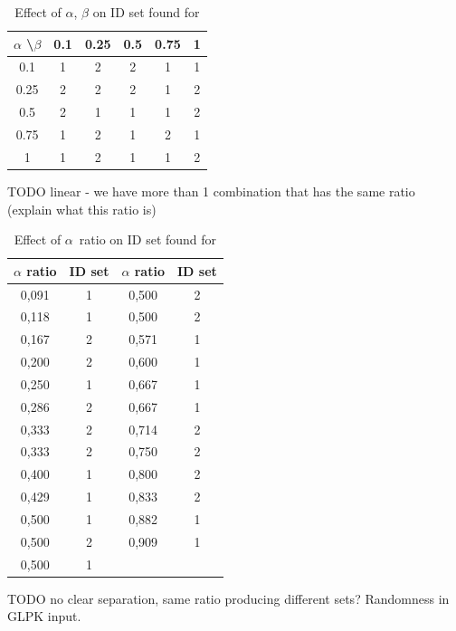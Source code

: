 \begin{table}
  \caption{Effect of $\alpha$, $\beta$ on ID set found for }
  \bigskip
  \label{table-experiments-various-betas-ova1-effect}
  \centering
  \begin{tabular}{c | c  c  c  c  c}
    $\alpha$ \textbackslash $\beta$ & 0.1 & 0.25 & 0.5 & 0.75 & 1 \\
    \hline
    0.1  & 1 & 2 & 2 & 1 & 1 \\
    0.25 & 2 & 2 & 2 & 1 & 2 \\
    0.5  & 2 & 1 & 1 & 1 & 2 \\
    0.75 & 1 & 2 & 1 & 2 & 1 \\
    1    & 1 & 2 & 1 & 1 & 2 \\
  \end{tabular}
\end{table}

TODO linear - we have more than 1 combination that has the same ratio (explain what this ratio is)

\begin{table}
  \caption{Effect of $\alpha$\ ratio on ID set found for }
  \bigskip
  \label{table-experiments-various-betas-ova1-ratio-effect}
  \centering
  \begin{tabular}{c | c || c |  c}
    $\alpha$ ratio & ID set & $\alpha$ ratio & ID set \\
    \hline
    0,091	& 1 & 0,500	& 2 \\
    0,118	& 1 & 0,500	& 2 \\
    0,167	& 2 & 0,571	& 1 \\
    0,200	& 2 & 0,600	& 1 \\
    0,250	& 1 & 0,667	& 1 \\
    0,286	& 2 & 0,667	& 1 \\
    0,333	& 2 & 0,714	& 2 \\
    0,333	& 2 & 0,750	& 2 \\
    0,400	& 1 & 0,800	& 2 \\
    0,429	& 1 & 0,833	& 2 \\
    0,500	& 1 & 0,882	& 1 \\
    0,500	& 2 & 0,909	& 1 \\
    0,500	& 1 &       &   \\
  \end{tabular}
\end{table}

TODO no clear separation, same ratio producing different sets? Randomness in GLPK input.

